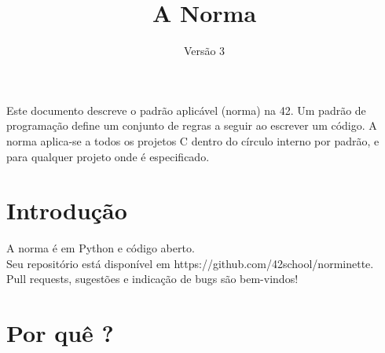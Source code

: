 \documentclass{42-pt}
\begin{document}
\title{A Norma}
\subtitle{Versão 3}

\summary
{
    Este documento descreve o padrão aplicável (norma) na 42. Um padrão de
	programação define um conjunto de regras a seguir ao escrever um código.
    A norma aplica-se a todos os projetos C dentro do círculo interno por padrão, e
    para qualquer projeto onde é especificado.
}

\maketitle

\tableofcontents



\chapter{Introdução}

    A norma é em Python e código aberto.\\
    Seu repositório está disponível em https://github.com/42school/norminette. \\
    Pull requests, sugestões e indicação de bugs são bem-vindos!


    \chapter{Por quê ?}
\end{document}
